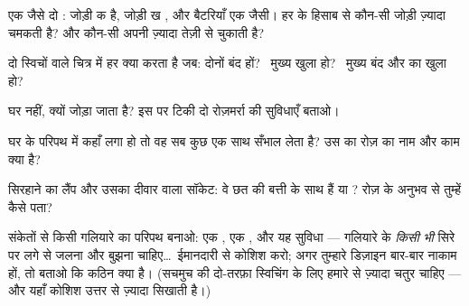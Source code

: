 \begin{exercise}[$\star$]\label{exo:g5:series-parallel-circuits:4}
एक जैसे दो : जोड़ी क  है, जोड़ी ख , और
बैटरियाँ एक जैसी। हर  के हिसाब से कौन-सी जोड़ी ज़्यादा चमकती है?
और कौन-सी अपनी  ज़्यादा तेज़ी से चुकाती है?
\end{exercise}

\begin{exercise}[$\star$]\label{exo:g5:series-parallel-circuits:5}
दो स्विचों वाले चित्र में हर  क्या करता है जब: दोनों  बंद
हों? \ मुख्य खुला हो? \ मुख्य बंद और  का  खुला हो?
\end{exercise}

\begin{exercise}[$\star$]\label{exo:g5:series-parallel-circuits:6}
घर  नहीं,  क्यों जोड़ा जाता है? इस पर टिकी दो
रोज़मर्रा की सुविधाएँ बताओ।
\end{exercise}

\begin{exercise}[$\star$]\label{exo:g5:series-parallel-circuits:7}
घर के परिपथ में  कहाँ लगा हो तो वह सब कुछ एक साथ सँभाल लेता है?
उस  का रोज़ का नाम और काम क्या है?
\end{exercise}

\begin{exercise}[$\star$]\label{exo:g5:series-parallel-circuits:8}
सिरहाने का लैंप और उसका दीवार वाला सॉकेट: वे छत की बत्ती के साथ
 हैं या ? रोज़ के अनुभव से तुम्हें कैसे पता?
\end{exercise}

\begin{exercise}[$\star\star$]\label{exo:g5:series-parallel-circuits:9}
संकेतों से किसी गलियारे का परिपथ बनाओ: एक , एक , और यह
सुविधा ---  गलियारे के \emph{किसी भी} सिरे पर लगे  से जलना
और बुझना चाहिए\dots\ ईमानदारी से कोशिश करो; अगर तुम्हारे डिज़ाइन बार-बार
नाकाम हों, तो बताओ कि कठिन क्या है। (सचमुच की दो-तरफ़ा स्विचिंग के
लिए हमारे  से ज़्यादा चतुर  चाहिए --- और यहाँ कोशिश उत्तर से
ज़्यादा सिखाती है।)
\end{exercise}

